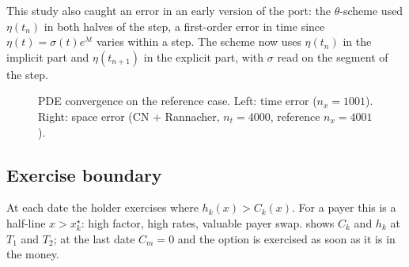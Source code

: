 \documentclass[11pt,a4paper]{article}
\theoremstyle{definition}
\theoremstyle{remark}
\begin{document}
This study also caught an error in an early version of the port: the $\theta$-scheme used $\eta(t_n)$ in both halves of
the step, a first-order error in time since $\eta(t)=\sigma(t)e^{\lambda t}$ varies within a step. The scheme now uses
$\eta(t_n)$ in the implicit part and $\eta(t_{n+1})$ in the explicit part, with $\sigma$ read on the segment of the step.

\begin{figure}[ht]\centering
{}\hfill
{}
\caption{PDE convergence on the reference case. Left: time error ($n_x=1001$). Right: space error (CN + Rannacher,
$n_t=4000$, reference $n_x=4001$).}\label{fig:conv}
\end{figure}

\begin{table}[ht]\centering\small
{}
\caption{Truncation of the PDE domain to $\pm n\sqrt{\alpha(T_m)}$ (space step kept constant).}\label{tab:domain}
\end{table}

\subsection{Exercise boundary}
At each date the holder exercises where $h_k(x)>C_k(x)$. For a payer this is a half-line $x>x^\star_k$: high factor, high
rates, valuable payer swap.  shows $C_k$ and $h_k$ at $T_1$ and $T_2$; at the last date $C_m=0$ and the
option is exercised as soon as it is in the money.
\end{document}
